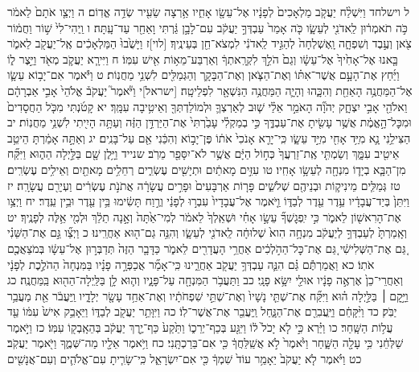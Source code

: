 \documentclass[twoside, openany, parskip=half, 11pt]{book}
\begin{document}
ל וישלחד וַיִּשְׁלַ֨ח יַעֲקֹ֤ב מַלְאָכִים֙ לְפָנָ֔יו אֶל־עֵשָׂ֖ו אָחִ֑יו אַ֥רְצָה שֵׂעִ֖יר שְׂדֵ֥ה אֱדֽוֹם׃ ה וַיְצַ֤ו אֹתָם֙ לֵאמֹ֔ר כֹּ֣ה תֹאמְר֔וּן לַֽאדֹנִ֖י לְעֵשָׂ֑ו כֹּ֤ה אָמַר֙ עַבְדְּךָ֣ יַעֲקֹ֔ב עִם־לָבָ֣ן גַּ֔רְתִּי וָאֵחַ֖ר עַד־עָֽתָּה׃ ו וַֽיְהִי־לִי֙ שׁ֣וֹר וַחֲמ֔וֹר צֹ֖אן וְעֶ֣בֶד וְשִׁפְחָ֑ה וָֽאֶשְׁלְחָה֙ לְהַגִּ֣יד לַֽאדֹנִ֔י לִמְצֹא־חֵ֖ן בְּעֵינֶֽיךָ׃ [לוי]ז וַיָּשֻׁ֙בוּ֙ הַמַּלְאָכִ֔ים אֶֽל־יַעֲקֹ֖ב לֵאמֹ֑ר בָּ֤אנוּ אֶל־אָחִ֙יךָ֙ אֶל־עֵשָׂ֔ו וְגַם֙ הֹלֵ֣ךְ לִקְרָֽאתְךָ֔ וְאַרְבַּע־מֵא֥וֹת אִ֖ישׁ עִמּֽוֹ׃ ח וַיִּירָ֧א יַעֲקֹ֛ב מְאֹ֖ד וַיֵּ֣צֶר ל֑וֹ וַיַּ֜חַץ אֶת־הָעָ֣ם אֲשֶׁר־אִתּ֗וֹ וְאֶת־הַצֹּ֧אן וְאֶת־הַבָּקָ֛ר וְהַגְּמַלִּ֖ים לִשְׁנֵ֥י מַחֲנֽוֹת׃ ט וַיֹּ֕אמֶר אִם־יָב֥וֹא עֵשָׂ֛ו אֶל־הַמַּחֲנֶ֥ה הָאַחַ֖ת וְהִכָּ֑הוּ וְהָיָ֛ה הַמַּחֲנֶ֥ה הַנִּשְׁאָ֖ר לִפְלֵיטָֽה׃ [ישראל]י וַיֹּ֘אמֶר֮ יַעֲקֹב֒ אֱלֹהֵי֙ אָבִ֣י אַבְרָהָ֔ם וֵאלֹהֵ֖י אָבִ֣י יִצְחָ֑ק יְהֹוָ֞ה הָאֹמֵ֣ר אֵלַ֗י שׁ֧וּב לְאַרְצְךָ֛ וּלְמוֹלַדְתְּךָ֖ וְאֵיטִ֥יבָה עִמָּֽךְ׃ יא קָטֹ֜נְתִּי מִכֹּ֤ל הַחֲסָדִים֙ וּמִכׇּל־הָ֣אֱמֶ֔ת אֲשֶׁ֥ר עָשִׂ֖יתָ אֶת־עַבְדֶּ֑ךָ כִּ֣י בְמַקְלִ֗י עָבַ֙רְתִּי֙ אֶת־הַיַּרְדֵּ֣ן הַזֶּ֔ה וְעַתָּ֥ה הָיִ֖יתִי לִשְׁנֵ֥י מַחֲנֽוֹת׃ יב הַצִּילֵ֥נִי נָ֛א מִיַּ֥ד אָחִ֖י מִיַּ֣ד עֵשָׂ֑ו כִּֽי־יָרֵ֤א אָנֹכִי֙ אֹת֔וֹ פֶּן־יָב֣וֹא וְהִכַּ֔נִי אֵ֖ם עַל־בָּנִֽים׃ יג וְאַתָּ֣ה אָמַ֔רְתָּ הֵיטֵ֥ב אֵיטִ֖יב עִמָּ֑ךְ וְשַׂמְתִּ֤י אֶֽת־זַרְעֲךָ֙ כְּח֣וֹל הַיָּ֔ם אֲשֶׁ֥ר לֹא־יִסָּפֵ֖ר מֵרֹֽב׃ שנייד וַיָּ֥לֶן שָׁ֖ם בַּלַּ֣יְלָה הַה֑וּא וַיִּקַּ֞ח מִן־הַבָּ֧א בְיָד֛וֹ מִנְחָ֖ה לְעֵשָׂ֥ו אָחִֽיו׃ טו עִזִּ֣ים מָאתַ֔יִם וּתְיָשִׁ֖ים עֶשְׂרִ֑ים רְחֵלִ֥ים מָאתַ֖יִם וְאֵילִ֥ים עֶשְׂרִֽים׃ טז גְּמַלִּ֧ים מֵינִיק֛וֹת וּבְנֵיהֶ֖ם שְׁלֹשִׁ֑ים פָּר֤וֹת אַרְבָּעִים֙ וּפָרִ֣ים עֲשָׂרָ֔ה אֲתֹנֹ֣ת עֶשְׂרִ֔ים וַעְיָרִ֖ם עֲשָׂרָֽה׃ יז וַיִּתֵּן֙ בְּיַד־עֲבָדָ֔יו עֵ֥דֶר עֵ֖דֶר לְבַדּ֑וֹ וַ֤יֹּאמֶר אֶל־עֲבָדָיו֙ עִבְר֣וּ לְפָנַ֔י וְרֶ֣וַח תָּשִׂ֔ימוּ בֵּ֥ין עֵ֖דֶר וּבֵ֥ין עֵֽדֶר׃ יח וַיְצַ֥ו אֶת־הָרִאשׁ֖וֹן לֵאמֹ֑ר כִּ֣י יִֽפְגׇשְׁךָ֞ עֵשָׂ֣ו אָחִ֗י וּשְׁאֵֽלְךָ֙ לֵאמֹ֔ר לְמִי־אַ֙תָּה֙ וְאָ֣נָה תֵלֵ֔ךְ וּלְמִ֖י אֵ֥לֶּה לְפָנֶֽיךָ׃ יט וְאָֽמַרְתָּ֙ לְעַבְדְּךָ֣ לְיַעֲקֹ֔ב מִנְחָ֥ה הִוא֙ שְׁלוּחָ֔ה לַֽאדֹנִ֖י לְעֵשָׂ֑ו וְהִנֵּ֥ה גַם־ה֖וּא אַחֲרֵֽינוּ׃ כ וַיְצַ֞ו גַּ֣ם אֶת־הַשֵּׁנִ֗י גַּ֚ם אֶת־הַשְּׁלִישִׁ֔י גַּ֚ם אֶת־כׇּל־הַהֹ֣לְכִ֔ים אַחֲרֵ֥י הָעֲדָרִ֖ים לֵאמֹ֑ר כַּדָּבָ֤ר הַזֶּה֙ תְּדַבְּר֣וּן אֶל־עֵשָׂ֔ו בְּמֹצַאֲכֶ֖ם אֹתֽוֹ׃ כא וַאֲמַרְתֶּ֕ם גַּ֗ם הִנֵּ֛ה עַבְדְּךָ֥ יַעֲקֹ֖ב אַחֲרֵ֑ינוּ כִּֽי־אָמַ֞ר אֲכַפְּרָ֣ה פָנָ֗יו בַּמִּנְחָה֙ הַהֹלֶ֣כֶת לְפָנָ֔י וְאַחֲרֵי־כֵן֙ אֶרְאֶ֣ה פָנָ֔יו אוּלַ֖י יִשָּׂ֥א פָנָֽי׃ כב וַתַּעֲבֹ֥ר הַמִּנְחָ֖ה עַל־פָּנָ֑יו וְה֛וּא לָ֥ן בַּלַּֽיְלָה־הַה֖וּא בַּֽמַּחֲנֶֽה׃ כג וַיָּ֣קׇם ׀ בַּלַּ֣יְלָה ה֗וּא וַיִּקַּ֞ח אֶת־שְׁתֵּ֤י נָשָׁיו֙ וְאֶת־שְׁתֵּ֣י שִׁפְחֹתָ֔יו וְאֶת־אַחַ֥ד עָשָׂ֖ר יְלָדָ֑יו וַֽיַּעֲבֹ֔ר אֵ֖ת מַעֲבַ֥ר יַבֹּֽק׃ כד וַיִּ֨קָּחֵ֔ם וַיַּֽעֲבִרֵ֖ם אֶת־הַנָּ֑חַל וַֽיַּעֲבֵ֖ר אֶת־אֲשֶׁר־לֽוֹ׃ כה וַיִּוָּתֵ֥ר יַעֲקֹ֖ב לְבַדּ֑וֹ וַיֵּאָבֵ֥ק אִישׁ֙ עִמּ֔וֹ עַ֖ד עֲל֥וֹת הַשָּֽׁחַר׃ כו וַיַּ֗רְא כִּ֣י לֹ֤א יָכֹל֙ ל֔וֹ וַיִּגַּ֖ע בְּכַף־יְרֵכ֑וֹ וַתֵּ֙קַע֙ כַּף־יֶ֣רֶךְ יַעֲקֹ֔ב בְּהֵאָֽבְק֖וֹ עִמּֽוֹ׃ כז וַיֹּ֣אמֶר שַׁלְּחֵ֔נִי כִּ֥י עָלָ֖ה הַשָּׁ֑חַר וַיֹּ֙אמֶר֙ לֹ֣א אֲשַֽׁלֵּחֲךָ֔ כִּ֖י אִם־בֵּרַכְתָּֽנִי׃ כח וַיֹּ֥אמֶר אֵלָ֖יו מַה־שְּׁמֶ֑ךָ וַיֹּ֖אמֶר יַעֲקֹֽב׃ כט וַיֹּ֗אמֶר לֹ֤א יַעֲקֹב֙ יֵאָמֵ֥ר עוֹד֙ שִׁמְךָ֔ כִּ֖י אִם־יִשְׂרָאֵ֑ל כִּֽי־שָׂרִ֧יתָ עִם־אֱלֹהִ֛ים וְעִם־אֲנָשִׁ֖ים 
\end{document}
